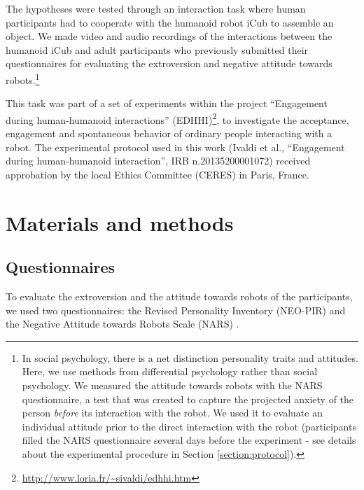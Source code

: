 \medskip
The hypotheses were tested through an interaction task where human participants had to cooperate with the humanoid robot iCub \cite{icub2013} to assemble an object. We made video and audio recordings of the interactions between the humanoid iCub and adult participants who previously submitted their questionnaires for evaluating the extroversion and negative attitude towards robots.\footnote{In social psychology, there is a net distinction personality traits and attitudes. Here, we use methods from differential psychology rather than social psychology. We measured the attitude towards robots with the NARS questionnaire, a test that was created to capture the projected anxiety of the person \textit{before} its interaction with the robot. We used it to evaluate an individual attitude prior to the direct interaction with the robot (participants filled the NARS questionnaire several days before the experiment - see details about the experimental procedure in Section \ref{section:protocol}).}

This task was part of a set of experiments within the project ``Engagement during human-humanoid interactions'' (EDHHI)\footnote{\url{http://www.loria.fr/~sivaldi/edhhi.htm}}, to investigate the acceptance, engagement and spontaneous behavior of ordinary people interacting with a robot.
The experimental protocol used in this work (Ivaldi et al., ``Engagement during human-humanoid interaction'', IRB n.20135200001072) received approbation by the local Ethics Committee (CERES) in Paris, France.



\section{Materials and methods}\label{sec:material}


\subsection{Questionnaires}

To evaluate the extroversion and the attitude towards robots of the participants, we used two questionnaires: the Revised Personality Inventory (NEO-PIR) \cite{NEOPIR1992} and the Negative Attitude towards Robots Scale (NARS) \cite{NARS2006}.

